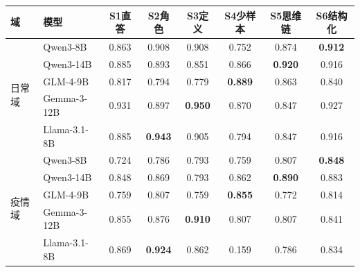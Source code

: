 \begin{tabular}{llcccccc}
\toprule
域 & 模型 & S1直答 & S2角色 & S3定义 & S4少样本 & S5思维链 & S6结构化 \\
\midrule
\multirow{5}{*}{日常域} & Qwen3-8B & 0.863 & 0.908 & 0.908 & 0.752 & 0.874 & \textbf{0.912} \\
& Qwen3-14B & 0.885 & 0.893 & 0.851 & 0.866 & \textbf{0.920} & 0.916 \\
& GLM-4-9B & 0.817 & 0.794 & 0.779 & \textbf{0.889} & 0.863 & 0.840 \\
& Gemma-3-12B & 0.931 & 0.897 & \textbf{0.950} & 0.870 & 0.847 & 0.927 \\
& Llama-3.1-8B & 0.885 & \textbf{0.943} & 0.905 & 0.794 & 0.847 & 0.916 \\
\midrule
\multirow{5}{*}{疫情域} & Qwen3-8B & 0.724 & 0.786 & 0.793 & 0.759 & 0.807 & \textbf{0.848} \\
& Qwen3-14B & 0.848 & 0.869 & 0.793 & 0.862 & \textbf{0.890} & 0.883 \\
& GLM-4-9B & 0.759 & 0.807 & 0.759 & \textbf{0.855} & 0.772 & 0.814 \\
& Gemma-3-12B & 0.855 & 0.876 & \textbf{0.910} & 0.807 & 0.807 & 0.841 \\
& Llama-3.1-8B & 0.869 & \textbf{0.924} & 0.862 & 0.159 & 0.786 & 0.834 \\
\bottomrule
\end{tabular}